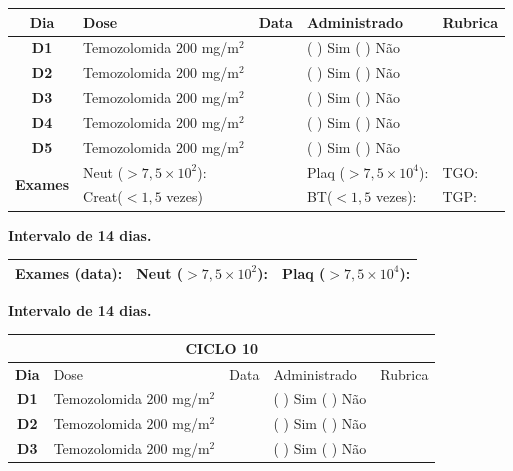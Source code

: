 \documentclass[11pt,a4paper,oldfontcommands]{memoir}
\begin{document}
\begin{center}
\begin{table}[H]
\begin{tabular}{p{1cm}p{5cm}|p{1cm}|p{4.5cm}|p{2cm}}
\hline
    \multicolumn{1}{c|}{\multirow{1}{*}{\textbf{Dia}}}&{Dose}&{Data}&{Administrado}&{Rubrica} \\
    \hline
    \multicolumn{1}{c|}{\multirow{1}{*}{\textbf{D1}}}&{Temozolomida \(200\) mg/m\(^2\)}&&{(  ) Sim (  ) Não}&\\
    \multicolumn{1}{c|}{\multirow{1}{*}{\textbf{D2}}}&{Temozolomida \(200\) mg/m\(^2\)}&&{(  ) Sim (  ) Não}&\\
    \multicolumn{1}{c|}{\multirow{1}{*}{\textbf{D3}}}&{Temozolomida \(200\) mg/m\(^2\)}&&{(  ) Sim (  ) Não}&\\
    \multicolumn{1}{c|}{\multirow{1}{*}{\textbf{D4}}}&{Temozolomida \(200\) mg/m\(^2\)}&&{(  ) Sim (  ) Não}&\\
    \multicolumn{1}{c|}{\multirow{1}{*}{\textbf{D5}}}&{Temozolomida \(200\) mg/m\(^2\)}&&{(  ) Sim (  ) Não}&\\
    \hline
    \multicolumn{1}{c|}{\multirow{2}{*}{\textbf{Exames}}}&\multicolumn{2}{l|}{Neut (\(>7,5\times10^2\)):}&{Plaq (\(>7,5\times10^4\)):}&{TGO:}\\
    \cline{2-5}
    \multicolumn{1}{c|}{\multirow{2}{*}{{}}}&\multicolumn{2}{l|}{Creat(\(<1,5\) vezes)}&{BT(\(<1,5\) vezes):}&{TGP:}
    \\
    \hline
\end{tabular}
\end{table}
\textbf{Intervalo de 14 dias.}
\begin{table}[H]
\begin{tabular}{p{5cm}|p{5cm}|p{4.7cm}}
    \hline
    \textbf{Exames (data):}&{Neut (\(>7,5\times10^2\)):}&{Plaq (\(>7,5\times10^4\)):}
    \\
    \hline
\end{tabular}
\end{table}
\textbf{Intervalo de 14 dias.}
\begin{table}[H]
\begin{tabular}{p{1cm}p{5cm}|p{1cm}|p{4.5cm}|p{2cm}}
	\hline
	\multicolumn{5}{c}{\textbf{CICLO 10}}\\
\hline
    \multicolumn{1}{c|}{\multirow{1}{*}{\textbf{Dia}}}&{Dose}&{Data}&{Administrado}&{Rubrica} \\
    \hline
    \multicolumn{1}{c|}{\multirow{1}{*}{\textbf{D1}}}&{Temozolomida \(200\) mg/m\(^2\)}&&{(  ) Sim (  ) Não}&\\
    \multicolumn{1}{c|}{\multirow{1}{*}{\textbf{D2}}}&{Temozolomida \(200\) mg/m\(^2\)}&&{(  ) Sim (  ) Não}&\\
    \multicolumn{1}{c|}{\multirow{1}{*}{\textbf{D3}}}&{Temozolomida \(200\) mg/m\(^2\)}&&{(  ) Sim (  ) Não}&\\

\end{tabular}
\end{table}
\end{center}
\end{document}
